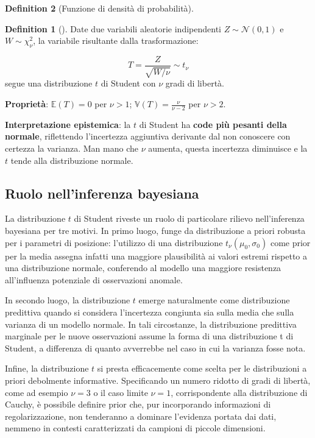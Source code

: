 \documentclass[
  letterpaper,
  DIV=11,
  numbers=noendperiod,
  oneside]{scrreprt}
\theoremstyle{definition}
\theoremstyle{plain}
\theoremstyle{definition}
\newtheorem{definition}{Definition}[chapter]
\theoremstyle{remark}
\begin{document}
\begin{definition}[Funzione di densità di
probabilità]
\begin{definition}[]
Date due variabili aleatorie indipendenti \(Z \sim \mathcal{N}(0, 1)\) e
\(W \sim \chi^2_\nu\), la variabile risultante dalla trasformazione:

\[
T = \frac{Z}{\sqrt{W/\nu}} \sim t_\nu
\] segue una distribuzione \(t\) di Student con \(\nu\) gradi di
libertà.

\textbf{Proprietà}: \(\mathbb{E}(T) = 0\) per \(\nu > 1\);
\(\mathbb{V}(T) = \frac{\nu}{\nu - 2}\) per \(\nu > 2\).

\end{definition}

\textbf{Interpretazione epistemica}: la \(t\) di Student ha \textbf{code
più pesanti della normale}, riflettendo l'incertezza aggiuntiva
derivante dal non conoscere con certezza la varianza. Man mano che
\(\nu\) aumenta, questa incertezza diminuisce e la \(t\) tende alla
distribuzione normale.

\subsection{Ruolo nell'inferenza
bayesiana}\label{ruolo-nellinferenza-bayesiana-9}

La distribuzione \(t\) di Student riveste un ruolo di particolare
rilievo nell'inferenza bayesiana per tre motivi. In primo luogo, funge
da distribuzione a priori robusta per i parametri di posizione:
l'utilizzo di una distribuzione \(t_\nu(\mu_0, \sigma_0)\) come prior
per la media assegna infatti una maggiore plausibilità ai valori estremi
rispetto a una distribuzione normale, conferendo al modello una maggiore
resistenza all'influenza potenziale di osservazioni anomale.

In secondo luogo, la distribuzione \(t\) emerge naturalmente come
distribuzione predittiva quando si considera l'incertezza congiunta sia
sulla media che sulla varianza di un modello normale. In tali
circostanze, la distribuzione predittiva marginale per le nuove
osservazioni assume la forma di una distribuzione t di Student, a
differenza di quanto avverrebbe nel caso in cui la varianza fosse nota.

Infine, la distribuzione \(t\) si presta efficacemente come scelta per
le distribuzioni a priori debolmente informative. Specificando un numero
ridotto di gradi di libertà, come ad esempio \(\nu = 3\) o il caso
limite \(\nu = 1\), corrispondente alla distribuzione di Cauchy, è
possibile definire prior che, pur incorporando informazioni di
regolarizzazione, non tenderanno a dominare l'evidenza portata dai dati,
nemmeno in contesti caratterizzati da campioni di piccole dimensioni.


\end{definition}
\end{document}
